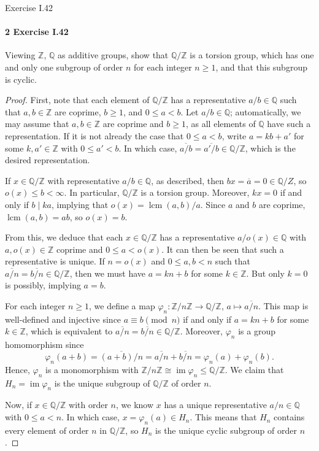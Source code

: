 \documentclass[12pt]{article}
\newlength{\myparskip}
\newenvironment{fullbox}{\begin{lrbox}{\savefullbox}\begin{minipage}{\dimexpr\textwidth-2\fboxsep\relax}\setlength{\parskip}{\myparskip}}{\end{minipage}\end{lrbox}\framebox[\textwidth]{\usebox{\savefullbox}}}
\newenvironment{pbox}[1][]{\begin{fullbox}\ifx#1\empty\else\paragraph{#1}\fi}{\end{fullbox}}
\newcommand{\Z}{\mathbb{Z}}
\newcommand{\Q}{\mathbb{Q}}
\renewcommand{\phi}{\varphi}
\newcommand{\<}{\langle}
\renewcommand{\>}{\rangle}
\newcommand{\isom}{\cong}
\newcommand{\eqc}{\overline}
\DeclareMathOperator{\im}{im}
\begin{document}
\newpage
\begin{pbox}[2 Exercise I.42]
    Viewing $\Z$, $\Q$ as additive groups, show that $\Q/\Z$ is a torsion group, which has one and only one subgroup of order $n$ for each integer $n \geq 1$, and that this subgroup is cyclic.
\end{pbox}

\begin{proof}
    First, note that each element of $\Q/\Z$ has a representative $a/b \in \Q$ such that $a, b \in \Z$ are coprime, $b \geq 1$, and $0 \leq a < b$. Let $a/b \in \Q$; automatically, we may assume that $a, b \in \Z$ are coprime and $b \geq 1$, as all elements of $\Q$ have such a representation. If it is not already the case that $0 \leq a < b$, write $a = kb + a'$ for some $k, a' \in \Z$ with $0 \leq a' < b$. In which case, $\eqc{a/b} = \eqc{a'/b} \in \Q/\Z$, which is the desired representation. 

    If $x \in \Q/\Z$ with representative $a/b \in \Q$, as described, then $bx = \eqc{a} = 0 \in \Q/Z$, so $o(x) \leq b < \infty$. In particular, $\Q/\Z$ is a torsion group. Moreover, $kx = 0$ if and only if $b \mid ka$, implying that $o(x) = \operatorname{lcm}(a, b)/a$. Since $a$ and $b$ are coprime, $\operatorname{lcm}(a, b) = ab$, so $o(x) = b$. 
    
    From this, we deduce that each $x \in \Q/\Z$ has a representative $a/o(x) \in \Q$ with $a, o(x) \in \Z$ coprime and $0 \leq a < o(x)$. It can then be seen that such a representative is unique. If $n = o(x)$ and $0 \leq a, b < n$ such that $\eqc{a/n} = \eqc{b/n} \in \Q/\Z$, then we must have $a = kn + b$ for some $k \in \Z$. But only $k = 0$ is possibly, implying $a = b$.

    For each integer $n \geq 1$, we define a map $\phi_n : \Z/n\Z \to \Q/\Z$, $a \mapsto \eqc{a/n}$. This map is well-defined and injective since $a \equiv b \pmod{n}$ if and only if $a = kn + b$ for some $k \in \Z$, which is equivalent to $\eqc{a/n} = \eqc{b/n} \in \Q/\Z$. Moreover, $\phi_n$ is a group homomorphism since
    \[
        \phi_n(a + b) = \eqc{(a + b)/n} = \eqc{a/n} + \eqc{b/n} = \phi_n(a) + \phi_n(b).
    \]
    Hence, $\phi_n$ is a monomorphism with $\Z/n\Z \isom \im\phi_n \leq \Q/\Z$. We claim that $H_n = \im\phi_n$ is the unique subgroup of $\Q/\Z$ of order $n$.

    Now, if $x \in \Q/\Z$ with order $n$, we know $x$ has a unique representative $a/n \in \Q$ with $0 \leq a < n$. In which case, $x = \phi_n(a) \in H_n$. This means that $H_n$ contains every element of order $n$ in $\Q/\Z$, so $H_n$ is the unique cyclic subgroup of order $n$.
    

\end{proof}
\end{document}
